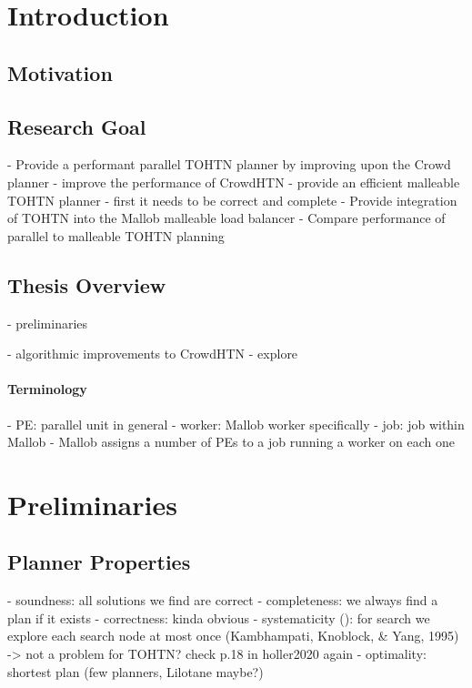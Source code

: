 \documentclass[enabledeprecatedfontcommands,12pt,a4paper,twoside]{scrartcl}
\numberwithin{equation}{section}
\begin{document}
\listoffigures
\listoftables
\listofalgorithms

\clearpage


\section{Introduction}
\subsection{Motivation}

\subsection{Research Goal}
- Provide a performant parallel TOHTN planner by improving upon the Crowd planner
- improve the performance of CrowdHTN
- provide an efficient malleable TOHTN planner
	- first it needs to be correct and complete
- Provide integration of TOHTN into the Mallob malleable load balancer
- Compare performance of parallel to malleable TOHTN planning

\subsection{Thesis Overview}
- preliminaries

- algorithmic improvements to CrowdHTN
	- explore 

\paragraph{Terminology}
- PE: parallel unit in general
- worker: Mallob worker specifically
- job: job within Mallob
- Mallob assigns a number of PEs to a job running a worker on each one

\section{Preliminaries}

\subsection{Planner Properties}
- soundness: all solutions we find are correct
- completeness: we always find a plan if it exists
- correctness: kinda obvious
- systematicity (\cite{holler2020htn}): for search we explore each search node at most once (Kambhampati, Knoblock, \& Yang, 1995) -> not a problem for TOHTN? check p.18 in holler2020 again
- optimality: shortest plan (few planners, Lilotane maybe?)
\end{document}
